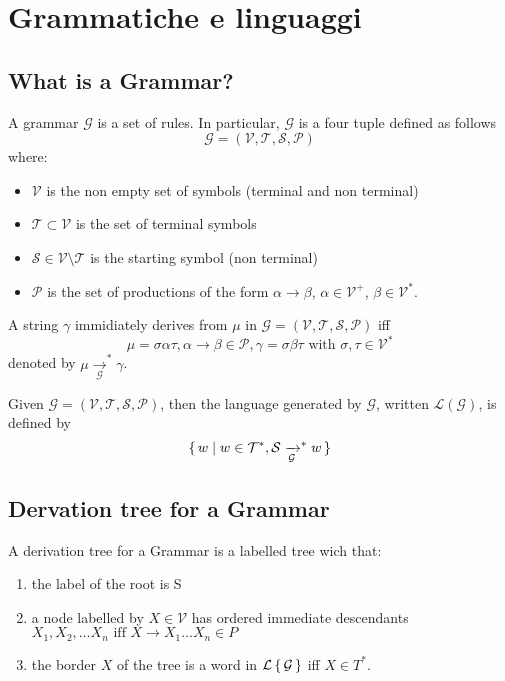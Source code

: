 \chapter{Grammatiche e linguaggi}

\section{What is a Grammar?}

A grammar $\mathcal{G}$ is a set of rules. In particular, $\mathcal{G}$ is a four tuple defined as follows
\begin{equation}
\mathcal{G} = (\mathcal{V}, \mathcal{T}, \mathcal{S}, \mathcal{P})
\end{equation}
where:
\begin{itemize}
\item $\mathcal{V}$ is the non empty set of symbols (terminal and non terminal)
\item $\mathcal{T} \subset \mathcal{V}$ is the set of terminal symbols
\item $\mathcal{S} \in \mathcal{V} \setminus \mathcal{T}$ is the starting symbol (non terminal)
\item $\mathcal{P}$ is the set of productions of the form $\alpha \rightarrow \beta$, $\alpha \in \mathcal{V}^+$, $\beta \in \mathcal{V}^*$.
\end{itemize}

A string $\gamma$ immidiately derives from $\mu$ in $\mathcal{G} = (\mathcal{V}, \mathcal{T}, \mathcal{S}, \mathcal{P})$ iff
\begin{equation}
\mu = \sigma \alpha \tau, \alpha \rightarrow \beta \in \mathcal{P}, \gamma = \sigma \beta \tau \text{ with } \sigma,\tau \in \mathcal{V}^*
\end{equation}
denoted by $\mu \xrightarrow[\mathcal{G}]{}^* \gamma$.

Given $\mathcal{G} = (\mathcal{V}, \mathcal{T}, \mathcal{S}, \mathcal{P})$, then the language generated by $\mathcal{G}$, written $\mathcal{L(G)}$, is defined by
\[
\set{ w | w \in \mathcal{T}^*, \mathcal{S} \xrightarrow[\mathcal{G}]{}^* w }
\]

\section{Dervation tree for a Grammar}
A derivation tree for a Grammar  is a labelled tree wich that:
\begin{enumerate}
\item the label of the root is S
\item a node labelled by $X \in \mathcal{V}$ has ordered immediate descendants \\ $X_1, X_2, \dots X_n \text{ iff } X \rightarrow X_1 \dots X_n \in P$
\item the border $X$ of the tree is a word in $\mathcal{L\set{G}}$ iff $X \in T^*$.
\end{enumerate}

